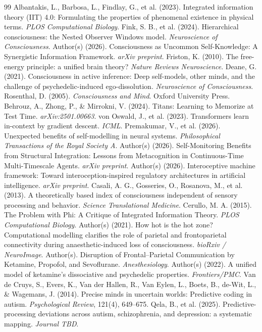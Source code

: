 \documentclass[11pt]{article}
\begin{document}
\begin{thebibliography}{99}
 Albantakis, L., Barbosa, L., Findlay, G., et al. (2023). Integrated information theory (IIT) 4.0: Formulating the properties of phenomenal existence in physical terms. \emph{PLOS Computational Biology}.
 Fink, S. B., et al. (2024). Hierarchical consciousness: the Nested Observer Windows model. \emph{Neuroscience of Consciousness}.
 Author(s) (2026). Consciousness as Uncommon Self-Knowledge: A Synergistic Information Framework. \emph{arXiv preprint}.
 Friston, K. (2010). The free-energy principle: a unified brain theory? \emph{Nature Reviews Neuroscience}.
 Deane, G. (2021). Consciousness in active inference: Deep self-models, other minds, and the challenge of psychedelic-induced ego-dissolution. \emph{Neuroscience of Consciousness}.
 Rosenthal, D. (2005). \emph{Consciousness and Mind}. Oxford University Press.
 Behrouz, A., Zhong, P., \& Mirrokni, V. (2024). Titans: Learning to Memorize at Test Time. \emph{arXiv:2501.00663}.
 von Oswald, J., et al. (2023). Transformers learn in-context by gradient descent. \emph{ICML}.
 Premakumar, V., et al. (2026). Unexpected benefits of self-modelling in neural systems. \emph{Philosophical Transactions of the Royal Society A}.
 Author(s) (2026). Self-Monitoring Benefits from Structural Integration: Lessons from Metacognition in Continuous-Time Multi-Timescale Agents. \emph{arXiv preprint}.
 Author(s) (2026). Interoceptive machine framework: Toward interoception-inspired regulatory architectures in artificial intelligence. \emph{arXiv preprint}.
 Casali, A. G., Gosseries, O., Rosanova, M., et al. (2013). A theoretically based index of consciousness independent of sensory processing and behavior. \emph{Science Translational Medicine}.
 Cerullo, M. A. (2015). The Problem with Phi: A Critique of Integrated Information Theory. \emph{PLOS Computational Biology}.
 Author(s) (2021). How hot is the hot zone? Computational modelling clarifies the role of parietal and frontoparietal connectivity during anaesthetic-induced loss of consciousness. \emph{bioRxiv / NeuroImage}.
 Author(s). Disruption of Frontal--Parietal Communication by Ketamine, Propofol, and Sevoflurane. \emph{Anesthesiology}.
 Author(s) (2022). A unified model of ketamine's dissociative and psychedelic properties. \emph{Frontiers/PMC}.
 Van de Cruys, S., Evers, K., Van der Hallen, R., Van Eylen, L., Boets, B., de-Wit, L., \& Wagemans, J. (2014). Precise minds in uncertain worlds: Predictive coding in autism. \emph{Psychological Review}, 121(4), 649--675.
 Qela, B., et al. (2025). Predictive-processing deviations across autism, schizophrenia, and depression: a systematic mapping. \emph{Journal TBD}.
\end{thebibliography}
\end{document}
